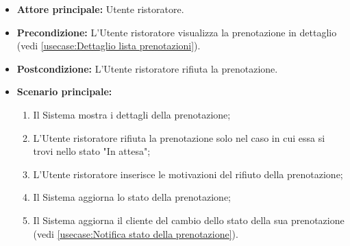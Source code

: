 \label{usecase:Rifiuta prenotazione}
\begin{itemize}
	\item \textbf{Attore principale:} Utente ristoratore.

	\item \textbf{Precondizione:} L'Utente ristoratore visualizza la prenotazione in dettaglio (vedi \autoref{usecase:Dettaglio lista prenotazioni}).

	\item \textbf{Postcondizione:} L'Utente ristoratore rifiuta la prenotazione.



	\item \textbf{Scenario principale:}
	      \begin{enumerate}
		      \item Il Sistema mostra i dettagli della prenotazione;
		      \item L'Utente ristoratore rifiuta la prenotazione solo nel caso in cui essa si trovi nello stato "In attesa";
		      \item L'Utente ristoratore inserisce le motivazioni del rifiuto della prenotazione;
		      \item Il Sistema aggiorna lo stato della prenotazione;
		      \item Il Sistema aggiorna il cliente del cambio dello stato della sua prenotazione (vedi \autoref{usecase:Notifica stato della prenotazione}).

	      \end{enumerate}
\end{itemize}
